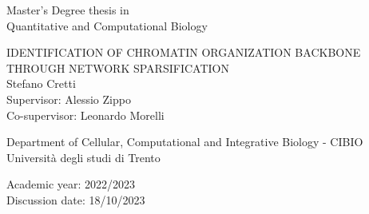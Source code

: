 \graphicspath{{chapters/00_title_page/}}

\pagestyle{empty}

\begin{center}

  \begin{figure}[h!]
    \centerline{}
  \end{figure}
  
  \vspace{1 cm}

  \Large{Master's Degree thesis in\\Quantitative and Computational Biology\\}  
  \vspace{1 cm}

  \LARGE\textsc{IDENTIFICATION OF CHROMATIN ORGANIZATION BACKBONE THROUGH NETWORK SPARSIFICATION\\}
  \vspace{0.5 cm}
  \LARGE{Stefano Cretti\\}
  \vspace{0.5 cm}
  \Large{Supervisor: Alessio Zippo\\}
  \Large{Co-supervisor: Leonardo Morelli\\}

  \vspace{2 cm} 
  \Large{Department of Cellular, Computational and Integrative Biology - CIBIO\\}
  \Large{Università degli studi di Trento}
  \vspace{0.5 cm}
  

  \Large{Academic year: 2022/2023}\\
  \Large{Discussion date: 18/10/2023}
  
\end{center}

\maketitle
